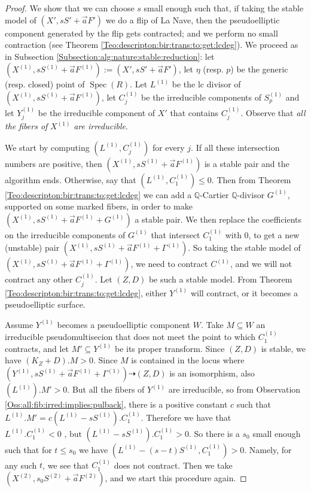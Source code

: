 \documentclass[11pt]{amsart}
\newcommand{\spec}{\operatorname{Spec}}
\theoremstyle{definition}
\begin{document}
\begin{proof}
 We show that we can choose $s$ small enough such that, if taking the stable model of $(X',sS'+\vec{a}F')$ we do a flip of
 La Nave, then the pseudoelliptic component generated by the flip gets contracted; and we perform no small contraction (see Theorem \ref{Teo:descripton:bir:trans:to:get:lcdeg}).  
 We proceed as in Subsection \ref{Subsection:alg:nature:stable:reduction}:
 let $(X^{(1)},sS^{(1)}+\vec{a}F^{(1)}):=(X',sS'+\vec{a}F')$, let $\eta$ (resp. $p$) be the generic (resp. closed) point
 of $\spec(R)$. Let $L^{(1)}$ be the lc divisor of
 $(X^{(1)},sS^{(1)}+\vec{a}F^{(1)})$, let $C^{(1)}_j$ be the irreducible components of $S^{(1)}_p$ and let $Y^{(1)}_j$ be the irreducible component
 of $X'$ that contains $C^{(1)}_j$. Observe that \emph{all the fibers of} $X^{(1)}$ \emph{are irreducible}. 
 
 We start by computing $(L^{(1)},C^{(1)}_j)$ for every $j$. If all these intersection numbers are positive, then
 $(X^{(1)},sS^{(1)}+\vec{a}F^{(1)})$ is a stable pair and the algorithm ends. Otherwise, say that
 $(L^{(1)},C^{(1)}_1)\le 0$. Then from Theorem \ref{Teo:descripton:bir:trans:to:get:lcdeg}
 we can add a $\mathbb{Q}$-Cartier $\mathbb{Q}$-divisor $G^{(1)}$, supported on some marked fibers, in order to make $(X^{(1)},sS^{(1)}+\vec{a}F^{(1)}+G^{(1)})$ a stable pair. We then replace the coefficients on the irreducible components of $G^{(1)}$ that intersect $C_1^{(1)}$ with 0, to get a new (unstable) pair $(X^{(1)},sS^{(1)}+\vec{a}F^{(1)}+\Gamma^{(1)})$. 
 So taking the stable model
 of $(X^{(1)},sS^{(1)}+\vec{a}F^{(1)}+\Gamma^{(1)})$, we need to contract $C^{(1)}$, and we will not contract any other $C^{(1)}_j$.
 Let $(Z,D)$ be such a stable model.
 From Theorem \ref{Teo:descripton:bir:trans:to:get:lcdeg}, either $Y^{(1)}$ will contract, or it becomes a pseudoelliptic surface.
 
 Assume $Y^{(1)}$ becomes a pseudoelliptic component $W$. Take $M \subseteq W$ an irreducible pseudomultisecion
 that does not meet the point to which $C^{(1)}_1$ contracts, and let $M' \subseteq Y^{(1)}$ be its proper transform.
 Since $(Z,D)$ is stable, we have $(K_Z+D).M>0$.
 Since $M$ is contained in the locus where $(Y^{(1)},sS^{(1)}+\vec{a}F^{(1)}+\Gamma^{(1)}) \dashrightarrow (Z,D)$ is an isomorphism,
 also $(L^{(1)}).M'>0$. 
 But all the fibers of $Y^{(1)}$ are irreducible,
 so from Observation \ref{Oss:all:fib:irred:implies:pulback}, there is a positive constant $c$ such that
 $L^{(1)}.M'=c(L^{(1)}-sS^{(1)}).C_1^{(1)}$. 
 Therefore we have that $L^{(1)}.C_1^{(1)}<0\text{ , but }(L^{(1)}-sS^{(1)}).C_1^{(1)}>0$. So there is a $s_0$ small enough such that
 for $t\le s_0$ we have $(L^{(1)}-(s-t)S^{(1)},C_1^{(1)})>0$. Namely, for any such $t$, we see that $C_1^{(1)}$ does not contract.
 Then we take
 $(X^{(2)},s_0S^{(2)}+\vec{a}F^{(2)})$, and we start this procedure again.
 

\end{proof}
\end{document}
